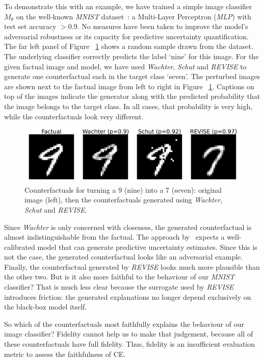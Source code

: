 \documentclass[letterpaper]{article} %
\begin{document}
To demonstrate this with an example, we have trained a simple image classifier $M_{\theta}$ on the well-known \textit{MNIST} dataset~\citep{lecun1998mnist}: a Multi-Layer Perceptron (\textit{MLP}) with test set accuracy $> 0.9$. No measures have been taken to improve the model's adversarial robustness or its capacity for predictive uncertainty quantification. The far left panel of Figure ~\ref{fig:motiv} shows a random sample drawn from the dataset. The underlying classifier correctly predicts the label `nine' for this image. For the given factual image and model, we have used \textit{Wachter}, \textit{Schut} and \textit{REVISE} to generate one counterfactual each in the target class `seven'. The perturbed images are shown next to the factual image from left to right in Figure ~\ref{fig:motiv}. Captions on top of the images indicate the generator along with the predicted probability that the image belongs to the target class. In all cases, that probability is very high, while the counterfactuals look very different.

\begin{figure}
  \centering
  \includegraphics[width=0.8\linewidth]{figures/mnist_motivation.png}
  \caption{Counterfactuals for turning a 9 (nine) into a 7 (seven): original image (left), then the counterfactuals generated using \textit{Wachter}, \textit{Schut} and \textit{REVISE}.}\label{fig:motiv}
\end{figure}

Since \textit{Wachter} is only concerned with closeness, the generated counterfactual is almost indistinguishable from the factual. The approach by~\citet{schut2021generating} expects a well-calibrated model that can generate predictive uncertainty estimates. Since this is not the case, the generated counterfactual looks like an adversarial example. Finally, the counterfactual generated by \textit{REVISE} looks much more plausible than the other two. But is it also more faithful to the behaviour of our \textit{MNIST} classifier? That is much less clear because the surrogate used by \textit{REVISE} introduces friction: the generated explanations no longer depend exclusively on the black-box model itself. 

So which of the counterfactuals most faithfully explains the behaviour of our image classifier? Fidelity cannot help us to make that judgement, because all of these counterfactuals have full fidelity. Thus, fidelity is an insufficient evaluation metric to assess the faithfulness of CE. 
\end{document}
